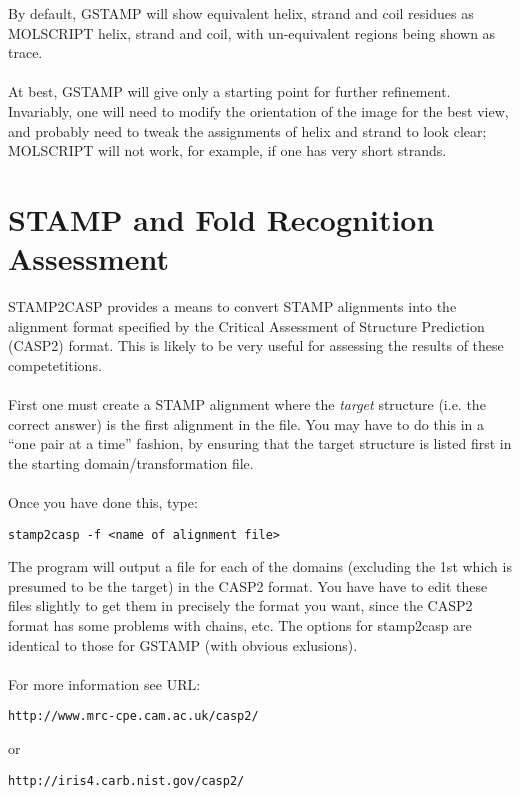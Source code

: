 By default, GSTAMP will show equivalent helix, strand and coil residues
as MOLSCRIPT \al helix, \be strand and coil, with un-equivalent regions 
being shown as \Cal trace.\\
\\
At best, GSTAMP will give only a starting point for further refinement.  
Invariably, one will need to modify the orientation of the image for the 
best view, and probably need to tweak the assignments of helix and strand 
to look clear; MOLSCRIPT will not work, for example, if one has very 
short \be strands.

\section{STAMP and Fold Recognition Assessment}

STAMP2CASP provides a means to convert STAMP alignments into the alignment
format specified by the Critical Assessment of Structure Prediction (CASP2)
format.  This is likely to be very useful for assessing the results of
these competetitions.\\
\\
First one must create a STAMP alignment where the {\em target} structure (i.e.
the correct answer) is the first alignment in the file.  You may have to
do this in a ``one pair at a time'' fashion, by ensuring that the target
structure is listed first in the starting domain/transformation file.\\
\\
Once you have done this, type:\\
\begin{scriptsize}\begin{verbatim}
stamp2casp -f <name of alignment file>
\end{verbatim} \end{scriptsize}

The program will output a file for each of the domains (excluding the 1st
which is presumed to be the target) in the CASP2 format.  You have have
to edit these files slightly to get them in precisely the format you want,
since the CASP2 format has some problems with chains, etc.  The options for
stamp2casp are identical to those for GSTAMP (with obvious exlusions).\\
\\
For more information see URL:\\
\begin{verbatim}
http://www.mrc-cpe.cam.ac.uk/casp2/
\end{verbatim} 
or \\
\begin{verbatim}
http://iris4.carb.nist.gov/casp2/
\end{verbatim} 

